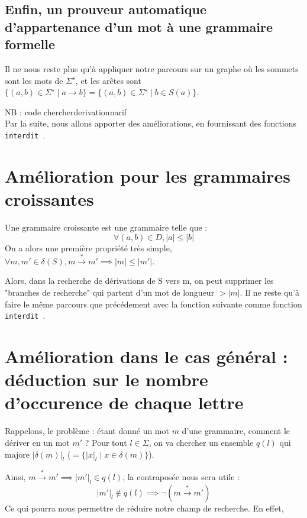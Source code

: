 \documentclass[a4paper,12pt]{article}
\newcommand{\norm}[1]{\lvert #1 \rvert}
\begin{document}
\subsection{Enfin, un prouveur automatique d'appartenance d'un mot à une grammaire formelle}

Il ne nous reste plus qu'à appliquer notre parcours sur un graphe où les sommets sont les mots de $\Sigma^\star$, et les
arêtes sont $\{(a,b) \in  \Sigma^\star \mid a \rightarrow b\} = \{(a,b) \in \Sigma^\star \mid b \in S(a)\}$.

{\color{gray} NB : code chercherderivationnarif}\\

Par la suite, nous allons apporter des améliorations, en fournissant des fonctions \texttt{ interdit }.

\section{Amélioration pour les grammaires croissantes}

Une grammaire croissante est une grammaire telle que :
\begin{equation}\forall (a,b) \in D, \norm{a} \leq \norm{b} \end{equation}
On a alors une première propriété très simple, $\forall m, m' \in \delta (S), m \overset{*}{\rightarrow} m' \implies \norm{m} \leq \norm{m'}$.

Alors, dans la recherche de dérivations de S vers m, on peut supprimer les "branches de recherche" qui partent d'un mot de longueur $> \norm{m}$.
Il ne reste qu'à faire le même parcours que précédement avec la fonction suivante comme fonction \texttt{ interdit }.

\section{Amélioration dans le cas général : déduction sur le nombre d'occurence de chaque lettre}
Rappelons, le problème : étant donné un mot $m$ d'une grammaire, comment le dériver en un mot $m'$ ?
Pour tout $l \in \Sigma$, on va chercher un ensemble $q(l)$ qui majore $\norm{\delta(m)}_l$ ($=\{\norm{x}_l \mid x \in \delta(m)\}$).

Ainsi, $m \overset{*}{\rightarrow} m' \implies \norm{m'}_l \in q(l)$, la contraposée nous sera utile : 
\begin{equation*}
\norm{m'}_l \notin q(l) \implies  \neg (m \overset{*}{\rightarrow} m')
\end{equation*}
Ce qui pourra nous permettre de réduire notre champ de recherche.
En effet, 
\end{document}
